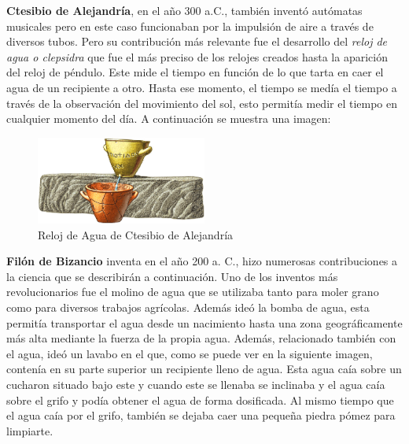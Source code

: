 \textbf{Ctesibio de Alejandría}, en el año 300 a.C., también inventó autómatas musicales pero en este caso funcionaban por la impulsión de aire a través de diversos tubos. Pero su contribución más relevante fue el desarrollo del \textit{reloj de agua o clepsidra} que fue el más preciso de los relojes creados hasta la aparición del reloj de péndulo. Este mide el tiempo en función de lo que tarta en caer el agua de un recipiente a otro. Hasta ese momento, el tiempo se medía el tiempo a través de la observación del movimiento del sol, esto permitía medir el tiempo en cualquier momento del día. A continuación se muestra una imagen:\\

	
\begin{figure}[H]
\begin{center}
  \includegraphics[width=0.5\textwidth]{./EtapaPrimeriza/imagenes/reloj.png}
  \caption{Reloj de Agua de Ctesibio de Alejandría}
  \label{reloj}
\end{center}
\end{figure}



\textbf{Filón de Bizancio} inventa en el año 200 a. C., hizo numerosas contribuciones a la ciencia que se describirán a continuación. Uno de los inventos más revolucionarios fue el molino de agua que se utilizaba tanto para moler grano como para diversos trabajos agrícolas. Además ideó la bomba de agua, esta permitía transportar el agua desde un nacimiento hasta una zona geográficamente más alta mediante la fuerza de la propia agua. Además, relacionado también con el agua, ideó un lavabo en el que, como se puede ver en la siguiente imagen, contenía en su parte superior un recipiente lleno de agua. Esta agua caía sobre un cucharon situado bajo este y cuando este se llenaba se inclinaba y el agua caía sobre el grifo y podía obtener el agua de forma dosificada. Al mismo tiempo que el agua caía por el grifo, también se dejaba caer una pequeña piedra pómez para limpiarte.\\


